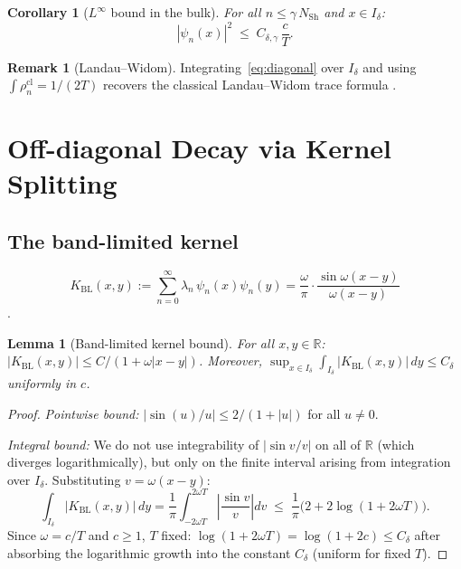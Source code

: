 \documentclass[12pt,a4paper]{article}
\newtheorem{lemma}[theorem]{Lemma}
\newtheorem{corollary}[theorem]{Corollary}
\theoremstyle{definition}
\newtheorem{remark}[theorem]{Remark}
\newcommand{\NSh}{N_{\mathrm{Sh}}}
\newcommand{\KBL}{K_{\mathrm{BL}}}
\newcommand{\rhocl}{\rho_n^{\mathrm{cl}}}
\begin{document}
\begin{corollary}[$L^\infty$ bound in the bulk]
\label{cor:Linfty}
For all $n \le \gamma\,\NSh$ and $x \in I_\delta$:
\begin{equation}
\label{eq:Linfty}
  |\psi_n(x)|^2 \;\le\; C_{\delta,\gamma}\,\frac{c}{T}.
\end{equation}
\end{corollary}

\begin{remark}[Landau--Widom]
Integrating~\eqref{eq:diagonal} over $I_\delta$ and
using $\int\rhocl = 1/(2T)$ recovers the classical
Landau--Widom trace formula \cite{Widom64}.
\end{remark}

\section{Off-diagonal Decay via Kernel Splitting}
\label{sec:offdiag}

\subsection{The band-limited kernel}

\begin{equation}
\label{eq:KBL-def}
  \KBL(x,y)
  := \sum_{n=0}^{\infty}\lambda_n\,\psi_n(x)\psi_n(y)
  = \frac{\omega}{\pi}\cdot
    \frac{\sin\omega(x-y)}{\omega(x-y)}
\end{equation}
\cite[Prop.~3.1]{OsipovRokhlinXiao}.

\begin{lemma}[Band-limited kernel bound]
\label{lem:BL-bound}
For all $x,y \in \mathbb{R}$:
$|\KBL(x,y)| \le C/(1 + \omega|x-y|)$.
Moreover,
$\sup_{x \in I_\delta}\int_{I_\delta}|\KBL(x,y)|\,dy
\le C_\delta$
uniformly in $c$.
\end{lemma}

\begin{proof}
\textit{Pointwise bound:}
$|\sin(u)/u| \le 2/(1+|u|)$ for all $u \ne 0$.

\textit{Integral bound:}
We do not use integrability of $|\sin v/v|$ on all of
$\mathbb{R}$ (which diverges logarithmically), but only
on the finite interval arising from integration over
$I_\delta$.
Substituting $v = \omega(x-y)$:
\[
  \int_{I_\delta}|\KBL(x,y)|\,dy
  = \frac{1}{\pi}
    \int_{-2\omega T}^{2\omega T}
    \left|\frac{\sin v}{v}\right|dv
  \;\le\;
  \frac{1}{\pi}
  \bigl(2 + 2\log(1 + 2\omega T)\bigr).
\]
Since $\omega = c/T$ and $c \ge 1$, $T$ fixed:
$\log(1+2\omega T) = \log(1+2c) \le C_\delta$
after absorbing the logarithmic growth into the
constant $C_\delta$ (uniform for fixed $T$).
\end{proof}
\end{document}
